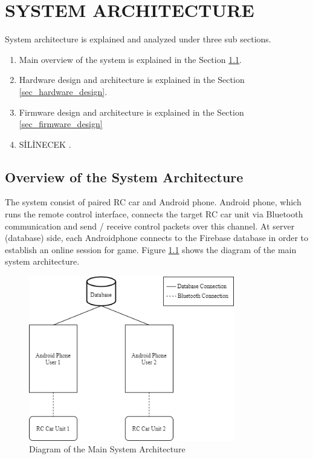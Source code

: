 \chapter{SYSTEM ARCHITECTURE} \label{chap_sys_architecture}
System architecture is explained and analyzed under three sub sections.
\begin{enumerate}
    \item Main overview of the system is explained in the Section \ref{sec_overview_sys_architecture}.
    \item Hardware design and architecture is explained in the Section \ref{sec_hardware_design}.
    \item Firmware design and architecture is explained in the Section \ref{sec_firmware_design}
    \item SİLİNECEK \cite{One, Two, Three}.
    
\end{enumerate}

\section{Overview of the System Architecture} \label{sec_overview_sys_architecture}

The system consist of paired RC car and Android phone. Android phone, which runs the remote control interface, connects the target RC car unit via Bluetooth communication and send / receive control packets over this channel. At server (database) side, each Android\texttrademark\;phone connects to the Firebase database in order to establish an online session for game. Figure \ref{fig:overview_architecture} shows the diagram of the main system architecture.

\begin{figure}[!htbp]
    \centering
    \includegraphics[width=0.8\textwidth]{Imgs/overview_of_sys.drawio.png}
    \caption{\label{fig:overview_architecture}Diagram of the Main System Architecture}
\end{figure}

